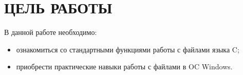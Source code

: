 \section{ЦЕЛЬ РАБОТЫ}

В данной работе необходимо:

\begin{itemize}
  \item ознакомиться со стандартными функциями работы с файлами языка C;
  \item приобрести практические навыки работы с файлами в OC Windows.
\end{itemize}

\newpage